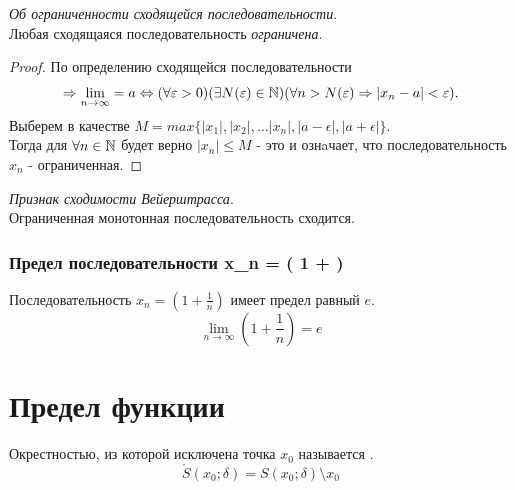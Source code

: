 \begin{theorem}
  \textit{Об ограниченности сходящейся последовательности}. \\ 
  Любая сходящаяся последовательность \textit{ограничена}. 
\end{theorem}

\begin{proof}
  По определению сходящейся последовательности 
  \begin{gather*}
    \implies \lim_{n \to \infty} = a \iff (\forall \epsilon > 0)(\exists N(\epsilon)\in \N)(\forall n > N(\epsilon) \implies |x_{n} - a| < \epsilon).
  \end{gather*}
  Выберем в качестве $M = max \{|x_{1}|, |x_2|, \ldots |x_n|, |a - \epsilon|, |a + \epsilon|\}$. \\
Тогда для $\forall n \in \mathbb{N}$ будет верно $|x_{n}| \le M$ - это и ознaчает, что последовательность $x_{n}$ - ограниченная.
\end{proof}

\begin{theorem}
  \textit{Признак сходимости Вейерштрасса}. \\
  Ограниченная монотонная последовательность сходится.
\end{theorem}

\subsubsection{Предел последовательности x_{n} = \left( 1 +  \right)}

\begin{theorem}
  Последовательность $x_{n} = \left( 1 + \frac{1}{n} \right) $ имеет предел равный $e$.
  \[
  \lim_{n \to \infty} \left( 1 + \frac{1}{n} \right) = e 
  \] 
\end{theorem}

\section{Предел функции}

\begin{definition}
  Окрестностью, из которой исключена точка $x_{0}$ называется .
  \[
    \mathring{S}(x_0; \delta) = S(x_0; \delta) \setminus {x_0}
  \] 
\end{definition}


